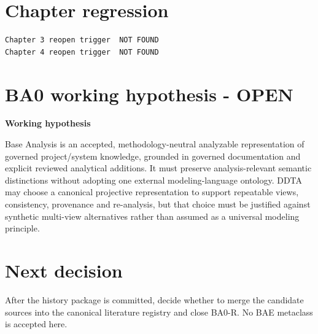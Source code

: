 \documentclass[10pt,a4paper]{article}
\newenvironment{gate}[1]{\def\FrameCommand{\fcolorbox{ddtagreen}{ddtagray}}\MakeFramed{\advance\hsize-2\width\FrameRestore}\noindent\textbf{#1}\par\smallskip}{\endMakeFramed}
\begin{document}
\section{Chapter regression}
\begin{lstlisting}
Chapter 3 reopen trigger  NOT FOUND
Chapter 4 reopen trigger  NOT FOUND
\end{lstlisting}
\section{BA0 working hypothesis - OPEN}
\begin{gate}{Working hypothesis}
Base Analysis is an accepted, methodology-neutral analyzable representation of governed project/system knowledge, grounded in governed documentation and explicit reviewed analytical additions. It must preserve analysis-relevant semantic distinctions without adopting one external modeling-language ontology. DDTA may choose a canonical projective representation to support repeatable views, consistency, provenance and re-analysis, but that choice must be justified against synthetic multi-view alternatives rather than assumed as a universal modeling principle.
\end{gate}
\section{Next decision}
After the history package is committed, decide whether to merge the candidate sources into the canonical literature registry and close BA0-R. No BAE metaclass is accepted here.
\end{document}
